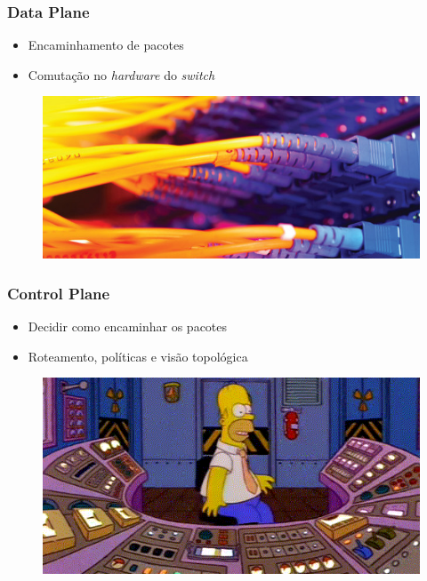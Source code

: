 %
%
\begin{frame}\frametitle{Data Plane}

    \begin{itemize}
    \item Encaminhamento de pacotes
    \item Comutação no \emph{hardware} do \emph{switch}
    \end{itemize}
        \begin{figure}[h]
        \centering
        \includegraphics[scale=2.0]{images/data-plane.png}
    \end{figure}
\end{frame}


%
%
\begin{frame}\frametitle{Control Plane}

    \begin{itemize}
    \item Decidir como encaminhar os pacotes
    \item Roteamento, políticas e visão topológica
    \end{itemize}
        \begin{figure}[h]
        \centering
        \includegraphics[scale=0.5]{images/control-plane.png}
    \end{figure}
\end{frame}




